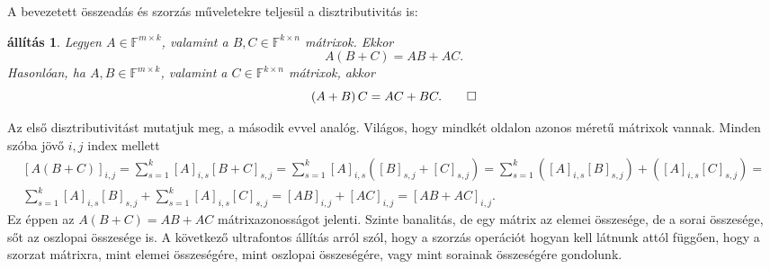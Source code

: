 \documentclass[9pt, a4paper, showtrims]{memoir}
\makeatletter
\renewenvironment{proof}[1][\proofname]
    {\par\pushQED{\qed}%
    \normalfont \topsep6\p@\@plus6\p@\relax
    \trivlist
    \item[\hskip\labelsep
        \itshape
    #1\@addpunct{:}]\ignorespaces}
    {\popQED\endtrivlist\@endpefalse}
\theoremstyle{plain}
\newtheorem{proposition}{állítás}[chapter]
\theoremstyle{remark}
\theoremstyle{definition}
\makeatother
\begin{document}
A bevezetett összeadás és szorzás műveletekre teljesül a disztributivitás is:
\begin{proposition}
	Legyen $A\in\mathbb{F}^{m\times k}$, valamint a $B,C\in\mathbb{F}^{k\times n}$ mátrixok.
	Ekkor
	\begin{displaymath}
		A\left( B+C \right)=AB+AC.
	\end{displaymath}
	Hasonlóan,
	ha $A,B\in\mathbb{F}^{m\times k}$, valamint a $C\in\mathbb{F}^{k\times n}$ mátrixok,
	akkor
	\begin{displaymath}
		\left( A+B \right)C=AC+BC.\qedhere
	\end{displaymath}
\end{proposition}
\begin{proof}
	Az első disztributivitást mutatjuk meg, a második evvel analóg.
	Világos, hogy mindkét oldalon azonos méretű mátrixok vannak.
	Minden szóba jövő $i,j$ index mellett
	\begin{multline*}
		\left[ A\left( B+C \right) \right]_{i,j}
		=
		\sum_{s=1}^k[A]_{i,s}\left[ B+C \right]_{s,j}
		=
		\sum_{s=1}^k[A]_{i,s}\left([B]_{s,j}+[C]_{s,j} \right)
		=
		\sum_{s=1}^k\left( [A]_{i,s}[B]_{s,j}\right)+\left([A]_{i,s}[C]_{s,j} \right)
		=
		\\
		\sum_{s=1}^k[A]_{i,s}[B]_{s,j}
		+
		\sum_{s=1}^k[A]_{i,s}[C]_{s,j}
		=
		\left[ AB \right]_{i,j}+\left[ AC \right]_{i,j}
		=
		[AB+AC]_{i,j}.
	\end{multline*}
	Ez éppen  az $A\left( B+C \right)=AB+AC$ mátrixazonosságot jelenti.
\end{proof}
Szinte banalitás,
de egy mátrix az elemei összesége, de a sorai összesége, sőt az oszlopai összesége is.
A következő ultrafontos állítás arról szól, hogy a szorzás operációt hogyan kell látnunk attól függően,
hogy a szorzat mátrixra,
mint elemei összeségére,
mint oszlopai összeségére,
vagy mint sorainak összeségére gondolunk.
\end{document}
